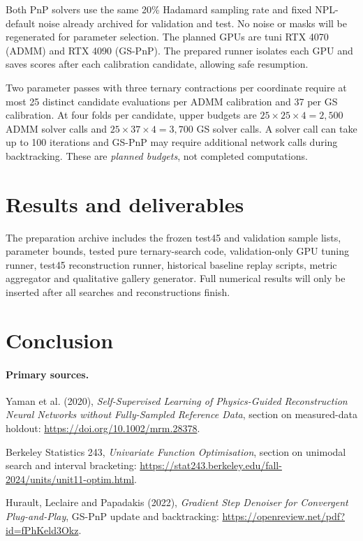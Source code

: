 \documentclass[10pt,a4paper]{article}
\begin{document}
Both PnP solvers use the same 20\% Hadamard sampling
rate and fixed NPL-default noise already archived
for validation and test. No noise or masks will be
regenerated for parameter selection.
The planned GPUs are tuni RTX 4070 (ADMM) and
RTX 4090 (GS-PnP). The prepared runner isolates
each GPU and saves scores after each calibration
candidate, allowing safe resumption.

Two parameter passes with three ternary contractions
per coordinate require at most 25 distinct candidate
evaluations per ADMM calibration and 37 per GS calibration.
At four folds per candidate, upper budgets are
$25\times25\times4=2{,}500$ ADMM solver calls and
$25\times37\times4=3{,}700$ GS solver calls.
A solver call can take up to 100 iterations and
GS-PnP may require additional network calls during
backtracking. These are \emph{planned budgets}, not
completed computations.

\section{Results and deliverables}


The preparation archive includes the frozen test45
and validation sample lists, parameter bounds,
tested pure ternary-search code, validation-only
GPU tuning runner, test45 reconstruction runner,
historical baseline replay scripts, metric
aggregator and qualitative gallery generator.
Full numerical results will only be inserted
after all searches and reconstructions finish.

\section{Conclusion}


\paragraph{Primary sources.}
Yaman et al. (2020), \emph{Self-Supervised Learning of Physics-Guided
Reconstruction Neural Networks without Fully-Sampled Reference Data},
section on measured-data holdout:
\url{https://doi.org/10.1002/mrm.28378}.

Berkeley Statistics 243, \emph{Univariate Function Optimisation},
section on unimodal search and interval bracketing:
\url{https://stat243.berkeley.edu/fall-2024/units/unit11-optim.html}.

Hurault, Leclaire and Papadakis (2022),
\emph{Gradient Step Denoiser for Convergent Plug-and-Play},
GS-PnP update and backtracking:
\url{https://openreview.net/pdf?id=fPhKeld3Okz}.
\end{document}
